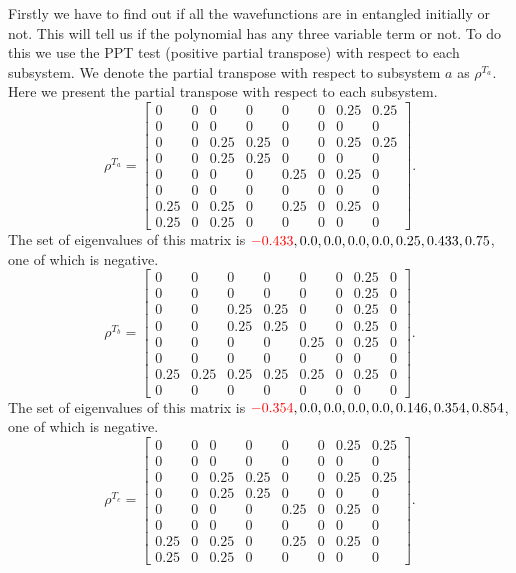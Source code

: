 \documentclass{scrartcl}
\begin{document}
 	Firstly we have to find out if all the wavefunctions are in entangled initially or not. This will tell us if the polynomial has any three variable term or not. To do this we use the PPT test (positive partial transpose) with respect to each subsystem.
 	We denote the partial transpose with respect to subsystem $a$ as $\rho^{T_a}$. Here we present the partial transpose with respect to each subsystem.
 	\begin{equation*}
 		\rho^{T_a} = \left[\begin{matrix}0 & 0 & 0 & 0 & 0 & 0 & 0.25 & 0.25\\0 & 0 & 0 & 0 & 0 & 0 & 0 & 0\\0 & 0 & 0.25 & 0.25 & 0 & 0 & 0.25 & 0.25\\0 & 0 & 0.25 & 0.25 & 0 & 0 & 0 & 0\\0 & 0 & 0 & 0 & 0.25 & 0 & 0.25 & 0\\0 & 0 & 0 & 0 & 0 & 0 & 0 & 0\\0.25 & 0 & 0.25 & 0 & 0.25 & 0 & 0.25 & 0\\0.25 & 0 & 0.25 & 0 & 0 & 0 & 0 & 0\end{matrix}\right].
 	\end{equation*}
 	The set of eigenvalues of this matrix is $\textcolor{red}{-0.433}, 0.0, 0.0, 0.0, 0.0, 0.25, 0.433, 0.75$, one of which is negative. 
 	\begin{equation*}
 		\rho^{T_b} = \left[\begin{matrix}0 & 0 & 0 & 0 & 0 & 0 & 0.25 & 0\\0 & 0 & 0 & 0 & 0 & 0 & 0.25 & 0\\0 & 0 & 0.25 & 0.25 & 0 & 0 & 0.25 & 0\\0 & 0 & 0.25 & 0.25 & 0 & 0 & 0.25 & 0\\0 & 0 & 0 & 0 & 0.25 & 0 & 0.25 & 0\\0 & 0 & 0 & 0 & 0 & 0 & 0 & 0\\0.25 & 0.25 & 0.25 & 0.25 & 0.25 & 0 & 0.25 & 0\\0 & 0 & 0 & 0 & 0 & 0 & 0 & 0\end{matrix}\right].
 	\end{equation*}
 	The set of eigenvalues of this matrix is $\textcolor{red}{-0.354}, 0.0, 0.0, 0.0, 0.0, 0.146, 0.354, 0.854$, one of which is negative. 
 	\begin{equation*}
 		\rho^{T_c} = \left[\begin{matrix}0 & 0 & 0 & 0 & 0 & 0 & 0.25 & 0.25\\0 & 0 & 0 & 0 & 0 & 0 & 0 & 0\\0 & 0 & 0.25 & 0.25 & 0 & 0 & 0.25 & 0.25\\0 & 0 & 0.25 & 0.25 & 0 & 0 & 0 & 0\\0 & 0 & 0 & 0 & 0.25 & 0 & 0.25 & 0\\0 & 0 & 0 & 0 & 0 & 0 & 0 & 0\\0.25 & 0 & 0.25 & 0 & 0.25 & 0 & 0.25 & 0\\0.25 & 0 & 0.25 & 0 & 0 & 0 & 0 & 0\end{matrix}\right].
 	\end{equation*}
\end{document}
